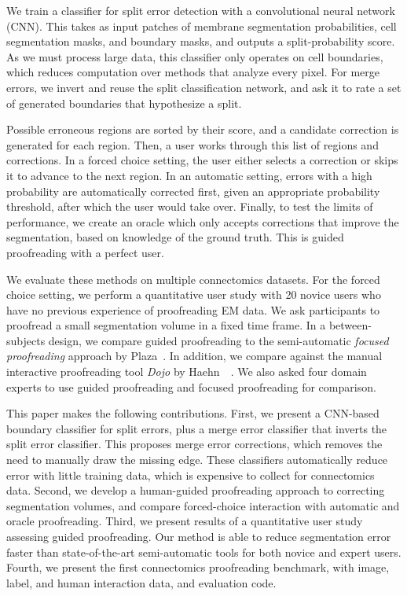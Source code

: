 We train a classifier for split error detection with a convolutional neural network
(CNN). This takes as input patches of membrane segmentation probabilities, cell
segmentation masks, and boundary masks, and outputs a split-probability score. As we
must process large data, this classifier only operates on cell boundaries, which
reduces computation over methods that analyze every pixel. For merge errors, we
invert and reuse the split classification network, and ask it to rate a
set of generated boundaries that hypothesize a split. %

Possible erroneous regions are sorted by their score, and a candidate correction is generated for each
region. Then, a user works through this list of regions and corrections. In a
forced choice setting, the user either selects a correction or skips it to
advance to the next region. In an automatic setting, errors with a high probability are automatically corrected first, given an appropriate
probability threshold, after which the user would take over. Finally, to test
the limits of performance, we create an oracle which only accepts corrections
that improve the segmentation, based on knowledge of the ground truth. This is
guided proofreading with a perfect user.

We evaluate these methods on multiple connectomics datasets. For the forced
choice setting, we perform a quantitative user study with 20 novice users who
have no previous experience of proofreading EM data. We ask participants to
proofread a small segmentation volume in a fixed time frame. In a
between-subjects design, we compare guided proofreading to the semi-automatic
\textit{focused proofreading} approach by Plaza~\cite{focused_proofreading}. In
addition, we compare against the manual interactive proofreading tool
\textit{Dojo} by Haehn~\etal~\cite{haehn_dojo_2014}. We also asked four domain
experts to use guided proofreading and focused proofreading for comparison.

This paper makes the following contributions.
%
First, we present a CNN-based boundary classifier for split errors, plus a merge
error classifier that inverts the split error classifier. This proposes merge error corrections, 
which removes the need to manually draw the missing
edge. These classifiers automatically reduce error with little training data, which is expensive to collect for connectomics data.
%
Second, we develop a human-guided proofreading approach to correcting segmentation
volumes, and compare forced-choice interaction with
automatic and oracle proofreading.
%
Third, we present results of a quantitative user study assessing
guided proofreading. Our method is able to reduce segmentation
error faster than state-of-the-art semi-automatic tools for both novice and
expert users.
%
Fourth, we present the first connectomics proofreading benchmark, with image, label, and human interaction data, and evaluation code.

